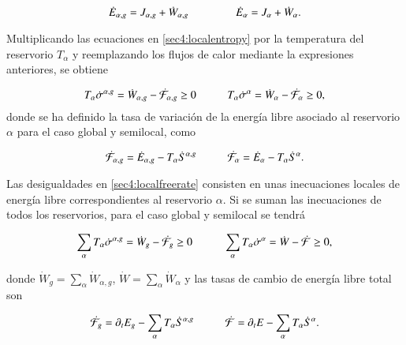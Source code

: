 \begin{equation*}
    \dot{E}_{\alpha,g} = J_{\alpha,g} + \dot{W}_{\alpha,g} \hspace{15mm} \dot{E}_{\alpha} = J_{\alpha} + \dot{W}_{\alpha}. 
\end{equation*}

Multiplicando las ecuaciones en \ref{sec4:localentropy} por la temperatura del reservorio $T_{\alpha}$ y reemplazando los flujos de calor mediante la expresiones anteriores, se obtiene

\begin{equation}
    T_{\alpha} \dot{\sigma}^{\alpha,g} = \dot{W}_{\alpha,g} - \dot{\mathcal{F}}_{\alpha,g} \geq 0 \hspace{10mm}  
    T_{\alpha} \dot{\sigma}^{\alpha} = \dot{W}_{\alpha} - \dot{\mathcal{F}}_{\alpha} \geq 0,              
\label{sec4:localfreerate}
\end{equation}
donde se ha definido la tasa de variación de la energía libre asociado al reservorio $\alpha$ para el caso global y semilocal, como

\begin{equation*}
    \dot{\mathcal{F}}_{\alpha,g} = \dot{E}_{\alpha,g} - T_{\alpha}\dot{S}^{\alpha,g} \hspace{10mm}
    \dot{\mathcal{F}}_{\alpha} = \dot{E}_{\alpha} - T_{\alpha}\dot{S}^{\alpha}.
\end{equation*}

Las desigualdades en \ref{sec4:localfreerate} consisten en unas inecuaciones locales de energía libre correspondientes al reservorio $\alpha$. Si se suman las inecuaciones de todos los reservorios, para el caso global y semilocal se tendrá 

\begin{equation}
    \sum_{\alpha}T_{\alpha} \dot{\sigma}^{\alpha,g} = \dot{W}_{g} - \dot{\mathcal{F}}_{g} \geq 0 \hspace{10mm}
    \sum_{\alpha}T_{\alpha} \dot{\sigma}^{\alpha} = \dot{W} - \dot{\mathcal{F}} \geq 0,
\label{sec4:freeratefinal}
\end{equation}

donde $\dot{W}_{g} = \sum_{\alpha}\dot{W}_{\alpha,g}$, $\dot{W} = \sum_{\alpha}\dot{W}_{\alpha}$  y las tasas de cambio de energía libre total son

\begin{equation*}
    \dot{\mathcal{F}}_{g} = \partial_{t}E_{g} - \sum_{\alpha}T_{\alpha} \dot{S}^{\alpha,g} \hspace{10mm}
    \dot{\mathcal{F}} = \partial_{t}E - \sum_{\alpha}T_{\alpha} \dot{S}^{\alpha}.
\end{equation*}

